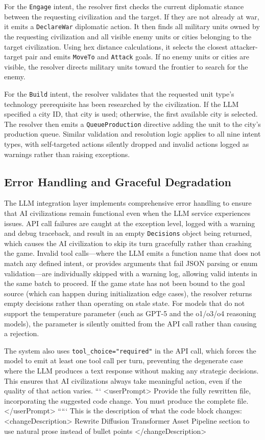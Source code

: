 \documentclass[conference]{IEEEtran}
\begin{document}
For the \texttt{Engage} intent, the resolver first checks the current diplomatic stance between the requesting civilization and the target. If they are not already at war, it emits a \texttt{DeclareWar} diplomatic action. It then finds all military units owned by the requesting civilization and all visible enemy units or cities belonging to the target civilization. Using hex distance calculations, it selects the closest attacker-target pair and emits \texttt{MoveTo} and \texttt{Attack} goals. If no enemy units or cities are visible, the resolver directs military units toward the frontier to search for the enemy.

For the \texttt{Build} intent, the resolver validates that the requested unit type's technology prerequisite has been researched by the civilization. If the LLM specified a city ID, that city is used; otherwise, the first available city is selected. The resolver then emits a \texttt{QueueProduction} directive adding the unit to the city's production queue. Similar validation and resolution logic applies to all nine intent types, with self-targeted actions silently dropped and invalid actions logged as warnings rather than raising exceptions.

\subsection{Error Handling and Graceful Degradation}

The LLM integration layer implements comprehensive error handling to ensure that AI civilizations remain functional even when the LLM service experiences issues. API call failures are caught at the exception level, logged with a warning and debug traceback, and result in an empty \texttt{Decisions} object being returned, which causes the AI civilization to skip its turn gracefully rather than crashing the game. Invalid tool calls---where the LLM emits a function name that does not match any defined intent, or provides arguments that fail JSON parsing or enum validation---are individually skipped with a warning log, allowing valid intents in the same batch to proceed. If the game state has not been bound to the goal source (which can happen during initialization edge cases), the resolver returns empty decisions rather than operating on stale state. For models that do not support the temperature parameter (such as GPT-5 and the o1/o3/o4 reasoning models), the parameter is silently omitted from the API call rather than causing a rejection.

The system also uses \texttt{tool\_choice="required"} in the API call, which forces the model to emit at least one tool call per turn, preventing the degenerate case where the LLM produces a text response without making any strategic decisions. This ensures that AI civilizations always take meaningful action, even if the quality of that action varies.
```
<userPrompt>
Provide the fully rewritten file, incorporating the suggested code change. You must produce the complete file.
</userPrompt>
`````
This is the description of what the code block changes:
<changeDescription>
Rewrite Diffusion Transformer Asset Pipeline section to use natural prose instead of bullet points
</changeDescription>
\end{document}
